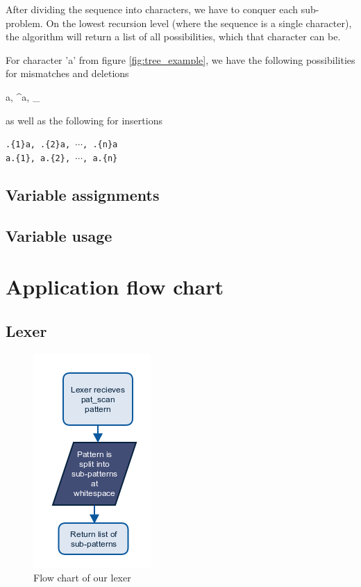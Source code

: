 \documentclass[12pt]{article}
\begin{document}
After dividing the sequence into characters, we have to conquer each sub-problem. On the lowest recursion level (where the sequence is a single character), the algorithm will return a list of all possibilities, which that character can be.

For character 'a' from figure \ref{fig:tree_example}, we have the following possibilities for mismatches and deletions

\begin{center}
	{a, \^{}a, \_}
\end{center}

as well as the following for insertions

\begin{center}
	\texttt{.\{1\}a, .\{2\}a, $\cdots$, .\{n\}a} \\
	\texttt{a.\{1\}, a.\{2\}, $\cdots$, a.\{n\}}
\end{center}


\subsection{Variable assignments}


\subsection{Variable usage}


\section{Application flow chart}

\subsection{Lexer}
\begin{figure}[H]
	\begin{center}
		\includegraphics[scale=1]{lexer.png}
	\end{center}
	\caption{Flow chart of our lexer}
\end{figure}
\end{document}
